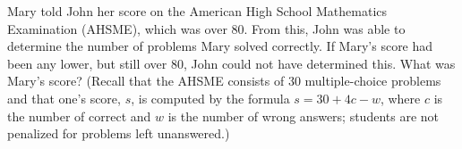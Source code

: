 Mary told John her score on the American High School Mathematics Examination (AHSME), which was over 80.  From this, John was able to determine the number of problems Mary solved correctly.  If Mary's score had been any lower, but still over 80, John could not have determined this.  What was Mary's score?  (Recall that the AHSME consists of 30 multiple-choice problems and that one's score, $s$, is computed by the formula $s = 30 + 4c - w$, where $c$ is the number of correct and $w$ is the number of wrong answers; students are not penalized for problems left unanswered.)